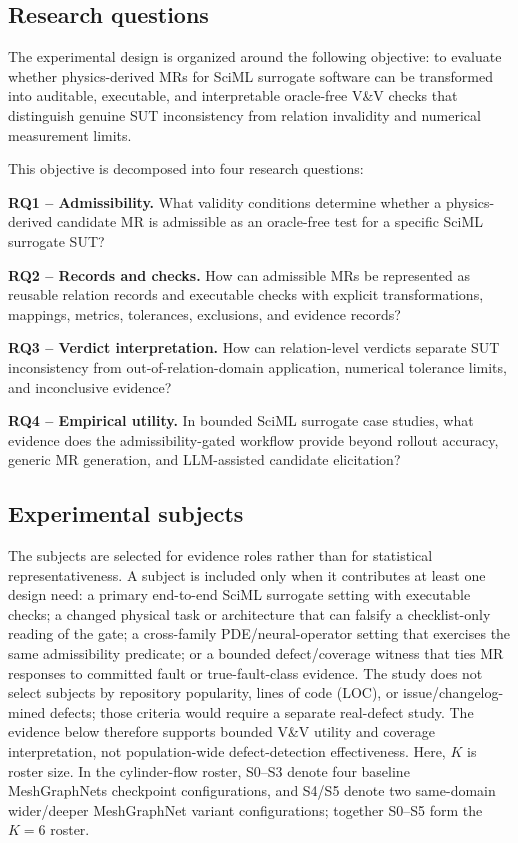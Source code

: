\documentclass[preprint,12pt]{elsarticle}
\begin{document}
\subsection{Research questions}
\label{subsec:rqs}
\label{subsec:evaluation-logic}

The experimental design is organized around the following objective: to evaluate whether physics-derived MRs for SciML surrogate software can be transformed into auditable, executable, and interpretable oracle-free V\&V checks that distinguish genuine SUT inconsistency from relation invalidity and numerical measurement limits.

This objective is decomposed into four research questions:

\textbf{RQ1 -- Admissibility.} What validity conditions determine whether a physics-derived candidate MR is admissible as an oracle-free test for a specific SciML surrogate SUT?

\textbf{RQ2 -- Records and checks.} How can admissible MRs be represented as reusable relation records and executable checks with explicit transformations, mappings, metrics, tolerances, exclusions, and evidence records?

\textbf{RQ3 -- Verdict interpretation.} How can relation-level verdicts separate SUT inconsistency from out-of-relation-domain application, numerical tolerance limits, and inconclusive evidence?

\textbf{RQ4 -- Empirical utility.} In bounded SciML surrogate case studies, what evidence does the admissibility-gated workflow provide beyond rollout accuracy, generic MR generation, and LLM-assisted candidate elicitation?

\subsection{Experimental subjects}
\label{subsec:suts}

The subjects are selected for evidence roles rather than for statistical representativeness. A subject is included only when it contributes at least one design need: a primary end-to-end SciML surrogate setting with executable checks; a changed physical task or architecture that can falsify a checklist-only reading of the gate; a cross-family PDE/neural-operator setting that exercises the same admissibility predicate; or a bounded defect/coverage witness that ties MR responses to committed fault or true-fault-class evidence. The study does not select subjects by repository popularity, lines of code (LOC), or issue/changelog-mined defects; those criteria would require a separate real-defect study. The evidence below therefore supports bounded V\&V utility and coverage interpretation, not population-wide defect-detection effectiveness. Here, \(K\) is roster size. In the cylinder-flow roster, S0--S3 denote four baseline MeshGraphNets checkpoint configurations, and S4/S5 denote two same-domain wider/deeper MeshGraphNet variant configurations; together S0--S5 form the \(K=6\) roster.
\end{document}
